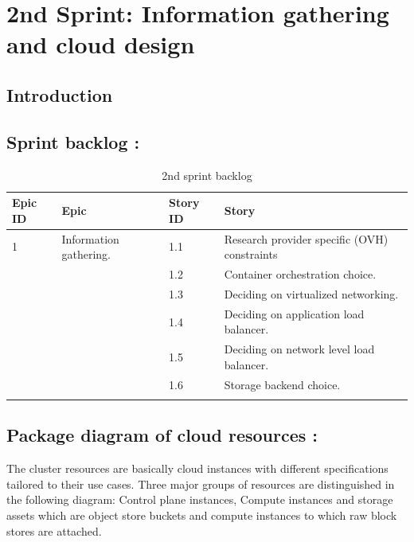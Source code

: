 \graphicspath{{./assets/}}
\setcounter{mtc}{4}
\chapter{2nd Sprint: Information gathering and cloud design }
\minitoc
\newpage

\section*{Introduction}

\section{Sprint backlog :}

\begin{longtable}[H]{|m{1.5cm}|m{3cm}|m{1.5cm}|m{8cm}|}
\hline
{\textbf{Epic ID}} & {\textbf{Epic}} & {\textbf{Story ID}} & {\textbf{Story}}\\
\hline
1  & Information gathering.	 &  1.1	 &  Research provider specific (OVH) constraints\\
\cline{3-4}
& & 1.2 & Container orchestration choice. \\
\cline{3-4}
& & 1.3	& Deciding on virtualized networking. \\
\cline{3-4}
& & 1.4	& Deciding on application load balancer. \\
\cline{3-4}
& & 1.5	& Deciding on network level load balancer. \\
\cline{3-4}
& & 1.6	& Storage backend choice.\\
\hline
\caption{2nd sprint backlog}
\end{longtable}


\section{Package diagram of cloud resources :}

The cluster resources are basically cloud instances with different specifications tailored to their use cases. Three major groups of resources are distinguished in the following diagram: Control plane instances, Compute instances and storage assets which are object store buckets and compute instances to which raw block stores are attached. 

